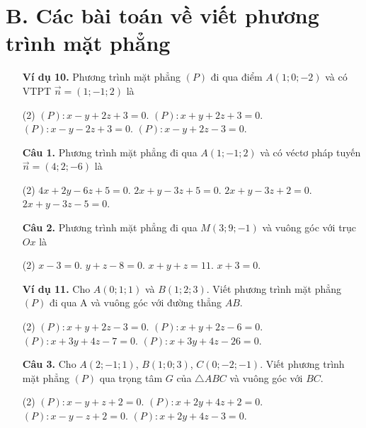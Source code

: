 \documentclass[12pt, a4paper]{article}
\renewcommand{\vec}[1]{\overrightarrow{#1}}
\begin{document}
\section*{B. Các bài toán về viết phương trình mặt phẳng}
\begin{enumerate}[label=\textbf{\arabic*.}, wide=0pt, leftmargin=*]
    \item[\textbf{Ví dụ 10.}] Phương trình mặt phẳng \((P)\) đi qua điểm \(A(1;0;-2)\) và có VTPT \(\vec{n}=(1;-1;2)\) là
    \begin{tasks}(2)
        \task \((P): x - y + 2z + 3 = 0\).
        \task \((P): x + y + 2z + 3 = 0\).
        \task \((P): x - y - 2z + 3 = 0\).
        \task \((P): x - y + 2z - 3 = 0\).
    \end{tasks}
    
    \item[\textbf{Câu 1.}] Phương trình mặt phẳng đi qua \(A(1;-1;2)\) và có véctơ pháp tuyến \(\vec{n}=(4;2;-6)\) là
    \begin{tasks}(2)
        \task \(4x + 2y - 6z + 5 = 0\).
        \task \(2x + y - 3z + 5 = 0\).
        \task \(2x + y - 3z + 2 = 0\).
        \task \(2x + y - 3z - 5 = 0\).
    \end{tasks}
    
    \item[\textbf{Câu 2.}] Phương trình mặt phẳng đi qua \(M(3;9;-1)\) và vuông góc với trục \(Ox\) là
    \begin{tasks}(2)
        \task \(x-3=0\).
        \task \(y+z-8=0\).
        \task \(x+y+z=11\).
        \task \(x+3=0\).
    \end{tasks}
    
    \item[\textbf{Ví dụ 11.}] Cho \(A(0;1;1)\) và \(B(1;2;3)\). Viết phương trình mặt phẳng \((P)\) đi qua A và vuông góc với đường thẳng \(AB\).
    \begin{tasks}(2)
        \task \((P): x+y+2z-3=0\).
        \task \((P): x+y+2z-6=0\).
        \task \((P): x+3y+4z-7=0\).
        \task \((P): x+3y+4z-26=0\).
    \end{tasks}

    \item[\textbf{Câu 3.}] Cho \(A(2;-1;1)\), \(B(1;0;3)\), \(C(0;-2;-1)\). Viết phương trình mặt phẳng \((P)\) qua trọng tâm \(G\) của \(\triangle ABC\) và vuông góc với \(BC\).
    \begin{tasks}(2)
        \task \((P): x - y + z + 2 = 0\).
        \task \((P): x + 2y + 4z + 2 = 0\).
        \task \((P): x - y - z + 2 = 0\).
        \task \((P): x + 2y + 4z - 3 = 0\).
    \end{tasks}
    

\end{enumerate}
\end{document}
